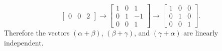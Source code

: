 \documentclass[11pt]{article}
\begin{document}
\begin{homeworkProblem}
\[\begin{bmatrix}
            0 & 0 & 2
        \end{bmatrix} \rightarrow
        \begin{bmatrix}
            1 & 0 & 1  \\
            0 & 1 & -1 \\
            0 & 0 & 1
        \end{bmatrix} \rightarrow
        \begin{bmatrix}
            1 & 0 & 0 \\
            0 & 1 & 0 \\
            0 & 0 & 1
        \end{bmatrix}.
    \]
    Therefore the vectors $(\alpha + \beta)$, $(\beta + \gamma)$, and $(\gamma + \alpha)$ are linearly independent.


\end{homeworkProblem}
\end{document}
